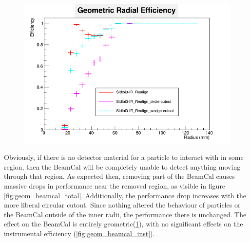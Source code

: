 \documentclass{report}
\begin{document}
                \begin{figure}[H]
                    \includegraphics[width=\textwidth]{RadialEfficiency_geometric_geom}
                    \centering
                    \caption{}
                    \label{fig:geom_beamcal_geom}
                \end{figure}

                Obviously, if there is no detector material for a particle to interact with in some region, then the BeamCal will be completely unable to detect anything moving through that region. As expected then, removing part of the BeamCal causes massive drops in performance near the removed region, as visible in figure \ref{fig:geom_beamcal_total}. Additionally, the performance drop increases with the more liberal circular cutout. Since nothing altered the behaviour of particles or the BeamCal outside of the inner radii, the performance there is unchanged. The effect on the BeamCal is entirely geometric(\ref{fig:geom_beamcal_geom}), with no significant effects on the instrumental efficiency (\ref{fig:geom_beamcal_inst}).
                
\end{document}
